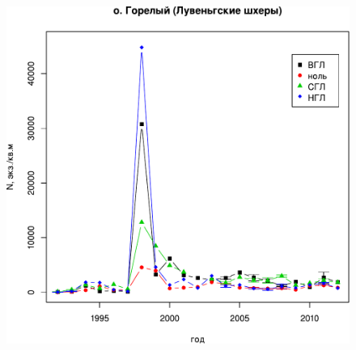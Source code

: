 \begin{figure}[p]
\begin{minipage}[b]{.49\linewidth}
\begin{center}
	\end{center}
	\end{minipage}
	\hfil %
	\begin{minipage}[b]{.49\linewidth}
	\begin{center}
		\includegraphics[width=\linewidth]{../White_Sea/Luvenga_Goreliy/N_dynamic1.pdf}
	\end{center}
	\end{minipage}




\end{figure}
